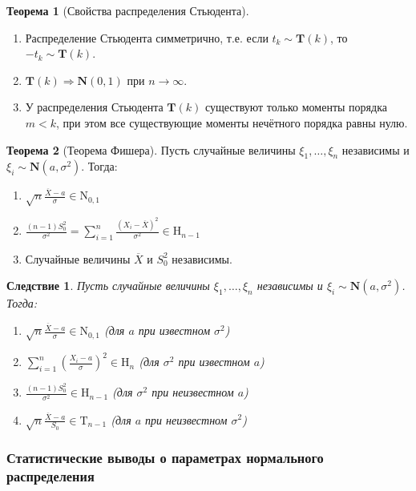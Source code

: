 \documentclass[oneside,final,14pt]{extreport}
\theoremstyle{plain}
\newtheorem*{crlr}{Следствие}
\theoremstyle{definition}
\theoremstyle{named}
\newtheorem*{namedthm}{Теорема}
\begin{document}
\begin{namedthm}[Свойства распределения Стьюдента]
\begin{enumerate}
    \item Распределение Стьюдента симметрично, т.е. если $t_k \sim \mathbf{T}(k)$, то $-t_k \sim \mathbf{T}(k)$.
    \item $\mathbf{T}(k) \Rightarrow \mathbf{N}(0,1)$ при $n \to \infty$.
    \item У распределения Стьюдента $\mathbf{T}(k)$ существуют только моменты порядка $m < k$, при этом все существующие моменты нечётного порядка равны нулю.
\end{enumerate}
\end{namedthm}

\begin{namedthm}[Теорема Фишера]
Пусть случайные величины $\xi_1, \ldots, \xi_n$ независимы и $\xi_i \sim \mathbf{N}(a,\sigma^{2})$. Тогда:
\begin{enumerate}
    \item $\sqrt{n} \frac{\overline{X}-a}{\sigma} \in \mathrm{N}_{0,1}$
    \item $\frac{(n-1) S_{0}^{2}}{\sigma^{2}}=\sum_{i=1}^{n} \frac{\left(X_{i}-\overline{X}\right)^{2}}{\sigma^{2}} \in \mathrm{H}_{n-1}$
    \item Случайные величины $\overline{X}$ и $S_{0}^{2}$ независимы.
\end{enumerate}
\end{namedthm}
\begin{crlr}
    Пусть случайные величины $\xi_1, \ldots, \xi_n$ независимы и $\xi_i \sim \mathbf{N}(a,\sigma^{2})$. Тогда:
    \begin{enumerate}
        \item $\sqrt{n} \frac{\overline{X}-a}{\sigma} \in \mathrm{N}_{0,1}$ (для $a$ при известном $\sigma^{2}$)
        \item $\sum_{i=1}^{n}\left(\frac{X_{i}-a}{\sigma}\right)^{2} \in \mathrm{H}_{n}$ (для $\sigma^{2}$ при известном $a$)
        \item $\frac{(n-1) S_{0}^{2}}{\sigma^{2}} \in \mathrm{H}_{n-1}$ (для $\sigma^{2}$ при неизвестном $a$)
        \item $\sqrt{n} \frac{\overline{X}-a}{S_{0}} \in \mathrm{T}_{n-1}$ (для $a$ при неизвестном $\sigma^{2}$)
    \end{enumerate}
\end{crlr}

\subsubsection{Статистические выводы о параметрах нормального распределения}
\end{document}
